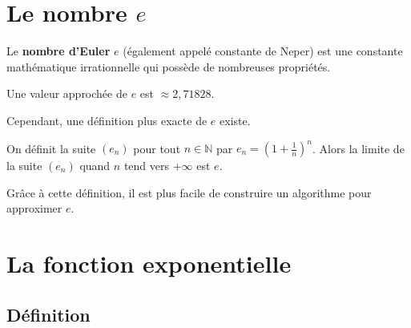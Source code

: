 






	\section{Le nombre \texorpdfstring{$e$}{e}}

	Le \textbf{nombre d'Euler} $e$ (également appelé constante de Neper) est une constante mathématique irrationnelle qui possède de nombreuses propriétés.

	\begin{formula}
		Une valeur approchée de $e$ est $\approx 2,71828$.
	\end{formula}

	\begin{nosummary}
		Cependant, une définition plus exacte de $e$ existe.

		\begin{formula}
			On définit la suite $(e_n)$ pour tout $n \in \mathbb{N}$ par $e_n = \left(1 + \frac{1}{n}\right)^n$.
			Alors la limite de la suite $(e_n)$ quand $n$ tend vers $+\infty$ est $e$.
		\end{formula}

		\begin{tip}
			Grâce à cette définition, il est plus facile de construire un algorithme pour approximer $e$.
		\end{tip}
	\end{nosummary}

	\section{La fonction exponentielle}

	\subsection{Définition}
	\label{definition}

